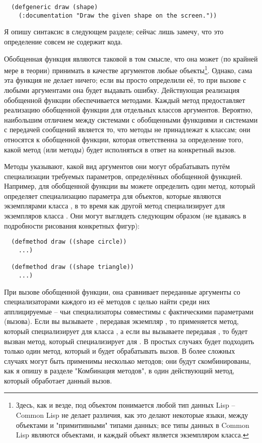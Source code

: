 \begin{lstlisting}
  (defgeneric draw (shape)
    (:documentation "Draw the given shape on the screen."))
\end{lstlisting}

Я опишу синтаксис  в следующем разделе; сейчас лишь замечу, что это
определение совсем не содержит кода.

Обобщенная функция являются таковой в том смысле, что она может (по крайней мере в теории)
принимать в качестве аргументов любые объекты\footnote{Здесь, как и везде, под объектом
  понимается любой тип данных Lisp -- Common Lisp не делает различия, как это делают
  некоторые языки, между объектами и "примитивными" типами данных; все типы данных в
  Common Lisp являются объектами, и каждый объект является экземпляром класса.}.  Однако,
сама эта функция не делает ничего; если вы просто определили её, то при вызове с любыми
аргументами она будет выдавать ошибку. Действующая реализация обобщенной функции
обеспечивается методами. Каждый метод предоставляет реализацию обобщенной функции для
отдельных классов аргументов.  Вероятно, наибольшим отличием между системами с обобщенными
функциями и системами с передачей сообщений является то, что методы не принадлежат к
классам; они относятся к обобщенной функции, которая ответственна за определение того,
какой метод (или методы) будет исполняться в ответ на конкретный вызов.

Методы указывают, какой вид аргументов они могут обрабатывать путём специализации
требуемых параметров, определённых обобщенной функцией.  Например, для обобщенной функции
 вы можете определить один метод, который определяет специализацию параметра
 для объектов, которые являются экземплярами класса , в то время
как другой метод специализирует  для экземпляров класса .  Они
могут выглядеть следующим образом (не вдаваясь в подробности рисования конкретных фигур):

\begin{lstlisting}
  (defmethod draw ((shape circle))
    ...)

  (defmethod draw ((shape triangle))
    ...)
\end{lstlisting}

При вызове обобщенной функции, она сравнивает переданные аргументы со специализаторами
каждого из её методов с целью найти среди них апплицируемые -- чьи специализаторы
совместимы с фактическими параметрами (вызова). Если вы вызываете , передавая
экземпляр , то применяется метод, который специализирует  для
класса , а если вы вызываете передавая , то будет вызван
метод, который специализирует  для .  В простых случаях будет
подходить только один метод, который и будет обрабатывать вызов.  В более сложных случаях
могут быть применимы несколько методов; они будут скомбинированы, как я опишу в разделе
"Комбинация методов", в один действующий метод, который обработает данный вызов.

